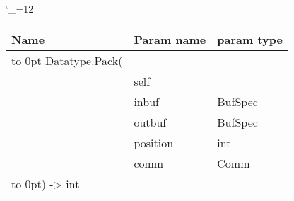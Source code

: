 \begingroup \catcode`\_=12 \tt
\begin{tabular}{lll}
\toprule
\textrm{Name}&\textrm{Param name}&\textrm{param type}\\
\midrule
\hbox to 0pt {Datatype.Pack(\hss}\\
& self\\
& inbuf & BufSpec\\
& outbuf & BufSpec\\
& position & int\\
& comm & Comm\\
\hbox to 0pt{) -> int\hss}\\
\bottomrule
\end{tabular}
\endgroup
